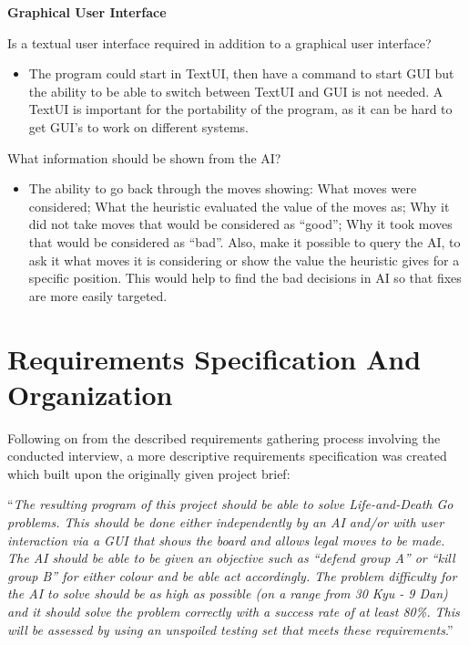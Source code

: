 \documentclass{l3proj}
\begin{document}
\textbf{Graphical User Interface}

Is a textual user interface required in addition to a graphical user interface?
\begin{itemize}
\item The program could start in TextUI, then have a command to start GUI but the ability to be able to switch between TextUI and GUI is not needed.  A TextUI is important for the portability of the program, as it can be hard to get GUI’s to work on different systems.
\end{itemize}
What information should be shown from the AI?
\begin{itemize}
\item The ability to go back through the moves showing: What moves were considered; What the heuristic evaluated the value of the moves as; Why it did not take moves that would be considered as “good”;  Why it took moves that would be considered as “bad”.  Also, make it possible to query the AI, to ask it what moves it is considering or show the value the heuristic gives for a specific position.  This would help to find the bad decisions in AI so that fixes are more easily targeted.
\end{itemize}

\section{Requirements Specification And Organization}

Following on from the described requirements gathering process involving the conducted interview, a more descriptive requirements specification was created which built upon the originally given project brief: 
\begin{center}
“\textit{The resulting program of this project should be able to solve Life-and-Death Go problems. This should be done either independently by an AI and/or with user interaction via a GUI that shows the board and allows legal moves to be made. The AI should be able to be given an objective such as “defend group A” or “kill group B” for either colour and be able act accordingly. The problem difficulty for the AI to solve should be as high as possible (on a range from 30 Kyu - 9 Dan) and it should solve the problem correctly with a success rate of at least 80\%. This will be assessed by using an unspoiled testing set that meets these requirements}.”
\end{center}
\end{document}
